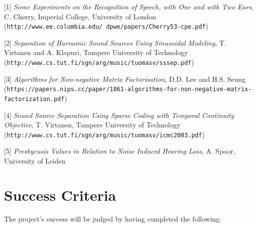 \documentclass[12pt,a4paper,twoside,openright]{report}
\begin{document}
\begin{description}

\item {[1]} \emph{Some Experiments on the Recognition of Speech, with One and with Two Ears}, C. Cherry, Imperial College, University of London\\
({\tt http://www.ee.columbia.edu/~dpwe/papers/Cherry53-cpe.pdf})

\item {[2]} \emph{Separation of Harmonic Sound Sources Using Sinusoidal Modeling}, T. Virtanen and A. Klapuri, Tampere University of Technology\\
({\tt http://www.cs.tut.fi/sgn/arg/music/tuomasv/sssep.pdf})

\item {[3]} \emph{Algorithms for Non-negative Matrix Factorisation}, D.D. Lee and H.S. Seung\\
({\tt \scriptsize https://papers.nips.cc/paper/1861-algorithms-for-non-negative-matrix-factorization.pdf})

\item {[4]} \emph{Sound Source Separation Using Sparse Coding with Temporal Continuity Objective}, T. Virtanen, Tampere University of Technology\\
({\tt http://www.cs.tut.fi/sgn/arg/music/tuomasv/icmc2003.pdf})

\item {[5]} \emph{Presbycusis Values in Relation to Noise Induced Hearing Loss}, A. Spoor, University of Leiden\\
\end{description}

\section*{Success Criteria}

The project's success will be judged by having completed the following:
\end{document}
